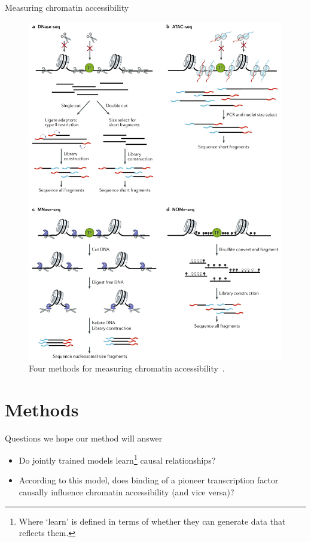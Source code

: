 \documentclass[pdf]{beamer} %
\begin{document}
\begin{frame}[t]{Measuring chromatin accessibility}
    \begin{figure}[htpb]
        \centering
        \includegraphics[width=0.4\linewidth]{figures/chrom_acc_measurement}
        \caption{Four methods for measuring chromatin accessibility~\cite{Klemm2019-hk}.}
        \label{fig:figures/chrom_acc_measurement}
    \end{figure} 
\end{frame}

\section{Methods}
\begin{frame}[t]{Questions we hope our method will answer}
    \begin{itemize}
        \item Do jointly trained models learn\footnote{Where `learn' is defined in terms of whether they can generate data that reflects them.} causal relationships?
        \item According to this model, does binding of a pioneer transcription factor causally influence chromatin accessibility (and vice versa)?
    \end{itemize}
\end{frame}

\end{document}
